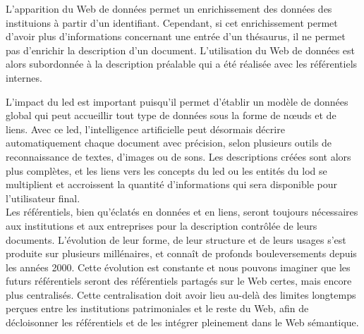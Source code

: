 \noindent L'apparition du Web de données permet un enrichissement des données des instituions à partir d'un identifiant. Cependant, si cet enrichissement permet d'avoir plus d'informations concernant une entrée d'un thésaurus, il ne permet pas d'enrichir la description d'un document. L'utilisation du Web de données est alors subordonnée à la description préalable qui a été réalisée avec les référentiels internes.

\noindent L'impact du \ac*{led} est important puisqu'il permet d'établir un modèle de données global qui peut accueillir tout type de données sous la forme de nœuds et de liens. Avec ce \ac{led}, l'intelligence artificielle peut désormais décrire automatiquement chaque document avec précision, selon plusieurs outils de reconnaissance de textes, d'images ou de sons. Les descriptions créées sont alors plus complètes, et les liens vers les concepts du \ac{led} ou les entités du \ac*{lod} se multiplient et accroissent la quantité d'informations qui sera disponible pour l'utilisateur final.\\

Les référentiels, bien qu'éclatés en données et en liens, seront toujours nécessaires aux institutions et aux entreprises pour la description contrôlée de leurs documents. L'évolution de leur forme, de leur structure et de leurs usages s'est produite sur plusieurs millénaires, et connaît de profonds bouleversements depuis les années 2000. Cette évolution est constante et nous pouvons imaginer que les futurs référentiels seront des référentiels partagés sur le Web certes, mais encore plus centralisés. Cette centralisation doit avoir lieu au-delà des limites longtemps perçues entre les institutions patrimoniales et le reste du Web, afin de décloisonner les référentiels et de les intégrer pleinement dans le Web sémantique.